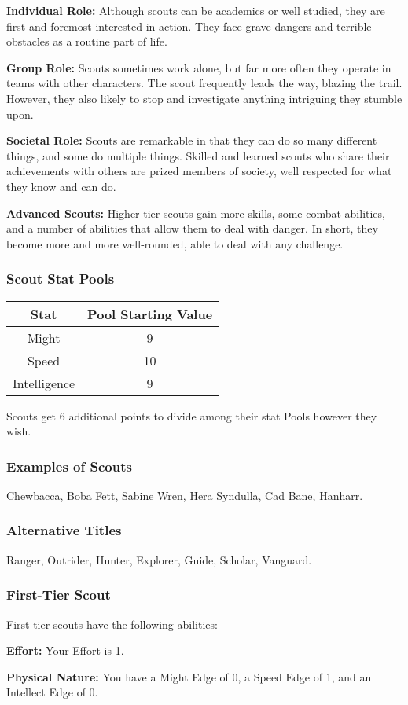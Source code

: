 \documentclass[a4paper,10pt,final,twocolumn,oneside]{book}
\newcommand{\statPool}[5]
{
	\subsubsection*{#1 Stat Pools}
	\label{subsub:#1StatPools}
	\begin{center}
	\begin{tabular}{ |c|c| }
	\hline
	\textbf{Stat} & \textbf{Pool Starting Value} \\
	\hline \hline
	Might & #2 \\
	\hline
 	Speed & #3  \\
 	\hline
 	Intelligence & #4  \\
 	\hline
	\end{tabular}
	\end{center}
	#1s get #5 additional points to divide among their stat Pools however they wish.
}
\newcommand{\itemLine}[2]{\textbf{#1:}{ #2}\par}
\begin{document}
\itemLine{Individual Role}{Although scouts can be academics or well studied, they are first and foremost interested in action. They face grave dangers and terrible obstacles as a routine part of life.}

\itemLine{Group Role}{Scouts sometimes work alone, but far more often they operate in teams with other characters. The scout frequently leads the way, blazing the trail. However, they also likely to stop and investigate anything intriguing they stumble upon.}

\itemLine{Societal Role}{Scouts are remarkable in that they can do so many different things, and some do multiple things. Skilled and learned scouts who share their achievements with others are prized members of society, well respected for what they know and can do.}

\itemLine{Advanced Scouts}{Higher-tier scouts gain more skills, some combat abilities, and a number of abilities that allow them to deal with danger. In short, they become more and more well-rounded, able to deal with any challenge.}

\statPool{Scout}{9}{10}{9}{6}

\subsubsection*{Examples of Scouts}
\label{subsub:scoutExamples}

Chewbacca, Boba Fett, Sabine Wren, Hera Syndulla, Cad Bane, Hanharr.

\subsubsection*{Alternative Titles}
\label{subsub:scoutAlternative}

Ranger, Outrider, Hunter, Explorer, Guide, Scholar, Vanguard.


\subsubsection*{First-Tier Scout}
\label{subsub:scoutFirstTier}

First-tier scouts have the following abilities:

\itemLine{Effort}{Your Effort is 1.}

\itemLine{Physical Nature}{You have a Might Edge of 0, a Speed Edge of 1, and an Intellect Edge of 0.}
\end{document}
